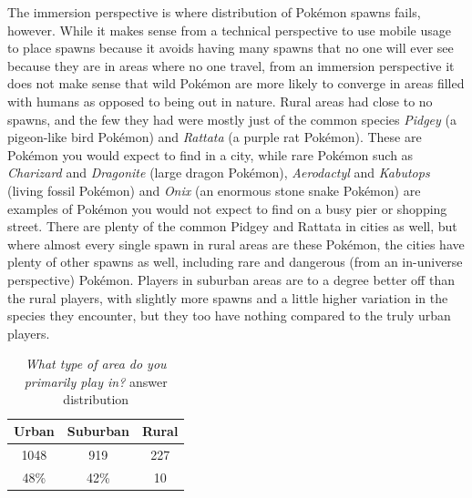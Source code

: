 The immersion perspective is where distribution of Pokémon spawns fails, however. While it makes sense from a technical perspective to use mobile usage to place spawns because it avoids having many spawns that no one will ever see because they are in areas where no one travel, from an immersion perspective it does not make sense that wild Pokémon are more likely to converge in areas filled with humans as opposed to being out in nature. Rural areas had close to no spawns, and the few they had were mostly just of the common species \emph{Pidgey} (a pigeon-like bird Pokémon) and \emph{Rattata} (a purple rat Pokémon). These are Pokémon you would expect to find in a city, while rare Pokémon such as \emph{Charizard} and \emph{Dragonite} (large dragon Pokémon), \emph{Aerodactyl} and \emph{Kabutops} (living fossil Pokémon) and \emph{Onix} (an enormous stone snake Pokémon) are examples of Pokémon you would not expect to find on a busy pier or shopping street. There are plenty of the common Pidgey and Rattata in cities as well, but where almost every single spawn in rural areas are these Pokémon, the cities have plenty of other spawns as well, including rare and dangerous (from an in-universe perspective) Pokémon. Players in suburban areas are to a degree better off than the rural players, with slightly more spawns and a little higher variation in the species they encounter, but they too have nothing compared to the truly urban players.

\begin{figure}[h]
	\centering
	\caption{}
\end{figure}

\begin{table}[h]
	\centering
	\caption{\emph{What type of area do you primarily play in?} answer distribution}
	\label{tbl:urban-level-distribution}
	\begin{tabular}{|c|c|c|}
		\hline
		\textbf{Urban} & \textbf{Suburban} & \textbf{Rural}\\
		\hline\hline
		1048	& 919	& 227\\
		48\%	& 42\%	& 10\\\hline
	\end{tabular}
\end{table}

